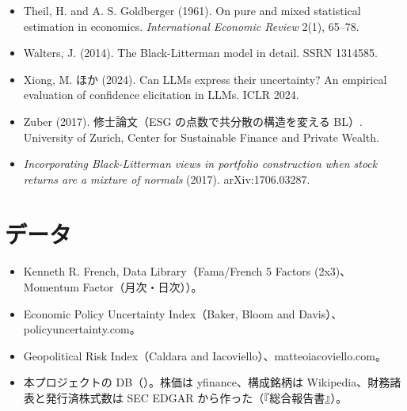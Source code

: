 {\begin{itemize}[leftmargin=1.2em,itemsep=0.25em,label={}]
\item Theil, H. and A. S. Goldberger (1961). On pure and mixed statistical estimation in economics. \textit{International Economic Review} 2(1), 65--78.
\item Walters, J. (2014). The Black-Litterman model in detail. SSRN 1314585.
\item Xiong, M. ほか (2024). Can LLMs express their uncertainty? An empirical evaluation of confidence elicitation in LLMs. ICLR 2024.
\item Zuber (2017). 修士論文（ESG の点数で共分散の構造を変える BL）. University of Zurich, Center for Sustainable Finance and Private Wealth.
\item \textit{Incorporating Black-Litterman views in portfolio construction when stock returns are a mixture of normals} (2017). arXiv:1706.03287.
\end{itemize}
}

\section*{データ}

{\small
\begin{itemize}[leftmargin=1.2em,itemsep=0.25em,label={}]
\item Kenneth R. French, Data Library（Fama/French 5 Factors (2x3)、Momentum Factor（月次・日次））。
\item Economic Policy Uncertainty Index（Baker, Bloom and Davis）、policyuncertainty.com。
\item Geopolitical Risk Index（Caldara and Iacoviello）、matteoiacoviello.com。
\item 本プロジェクトの DB（）。株価は yfinance、構成銘柄は Wikipedia、財務諸表と発行済株式数は SEC EDGAR から作った（『総合報告書』）。
\end{itemize}
}
